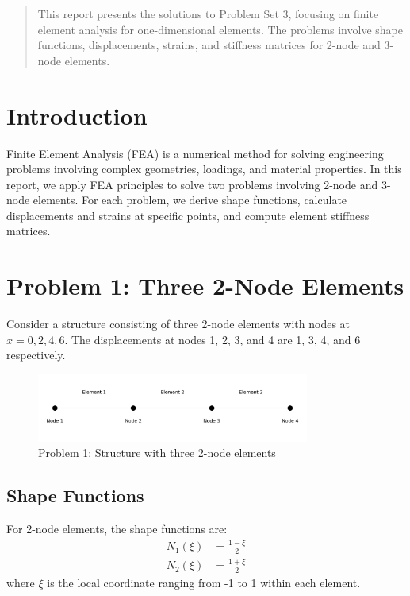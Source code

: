 \documentclass[12pt,a4paper]{article}
\begin{document}
\begin{abstract}
This report presents the solutions to Problem Set 3, focusing on finite element analysis for one-dimensional elements. The problems involve shape functions, displacements, strains, and stiffness matrices for 2-node and 3-node elements.
\end{abstract}

\section{Introduction}
Finite Element Analysis (FEA) is a numerical method for solving engineering problems involving complex geometries, loadings, and material properties. In this report, we apply FEA principles to solve two problems involving 2-node and 3-node elements. For each problem, we derive shape functions, calculate displacements and strains at specific points, and compute element stiffness matrices.

\section{Problem 1: Three 2-Node Elements}

Consider a structure consisting of three 2-node elements with nodes at $x = 0, 2, 4, 6$. The displacements at nodes 1, 2, 3, and 4 are 1, 3, 4, and 6 respectively.

\begin{figure}[H]
\centering
\includegraphics[width=0.8\textwidth]{figures/problem1_structure.png}
\caption{Problem 1: Structure with three 2-node elements}
\label{fig:problem1_structure}
\end{figure}

\subsection{Shape Functions}
For 2-node elements, the shape functions are:
\begin{align}
N_1(\xi) &= \frac{1-\xi}{2} \\
N_2(\xi) &= \frac{1+\xi}{2}
\end{align}
where $\xi$ is the local coordinate ranging from -1 to 1 within each element.
\end{document}
